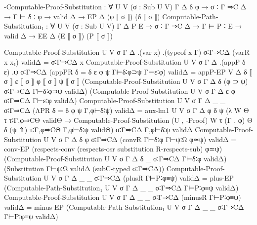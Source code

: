{-Computable-Proof-Substitution : ∀ U V (σ : Sub U V) Γ Δ δ φ →
  σ ∶ Γ ⇒C Δ → Γ ⊢ δ ∶ φ → valid Δ → EP Δ (φ ⟦ σ ⟧) (δ ⟦ σ ⟧)
Computable-Path-Substitution₁ : ∀ U V (σ : Sub U V) Γ Δ P E →
  σ ∶ Γ ⇒C Δ → Γ ⊢ P ∶ E → valid Δ → EE Δ (E ⟦ σ ⟧) (P ⟦ σ ⟧)

Computable-Proof-Substitution U V σ Γ Δ .(var x) .(typeof x Γ) σ∶Γ⇒CΔ (varR x x₁) validΔ = σ∶Γ⇒CΔ x
Computable-Proof-Substitution U V σ Γ Δ .(appP δ ε) .ψ σ∶Γ⇒CΔ (appPR {δ = δ} {ε} {φ} {ψ} Γ⊢δ∶φ⊃ψ Γ⊢ε∶φ) validΔ = appP-EP {V} {Δ} {δ ⟦ σ ⟧} {ε ⟦ σ ⟧} {φ ⟦ σ ⟧} {ψ ⟦ σ ⟧}
  (Computable-Proof-Substitution U V σ Γ Δ δ (φ ⊃ ψ) σ∶Γ⇒CΔ Γ⊢δ∶φ⊃ψ validΔ) 
  (Computable-Proof-Substitution U V σ Γ Δ ε φ σ∶Γ⇒CΔ Γ⊢ε∶φ validΔ)
Computable-Proof-Substitution U V σ Γ Δ _ _ σ∶Γ⇒CΔ (ΛPR {δ = δ} {φ} {ψ} Γ,φ⊢δ∶ψ) validΔ = 
  aux-lm1 U V σ Γ Δ φ δ ψ 
    (λ W Θ τ τ∶Γ,φ⇒CΘ validΘ → Computable-Proof-Substitution (U , -Proof) W τ (Γ , φ) Θ δ (ψ ⇑)
                          τ∶Γ,φ⇒CΘ Γ,φ⊢δ∶ψ validΘ) σ∶Γ⇒CΔ Γ,φ⊢δ∶ψ validΔ
Computable-Proof-Substitution U V σ Γ Δ δ φ σ∶Γ⇒CΔ (convR Γ⊢δ∶φ Γ⊢ψ∶Ω φ≃ψ) validΔ = 
  conv-EP (respects-conv (respects-osr substitution R-respects-sub) φ≃ψ) 
  (Computable-Proof-Substitution U V σ Γ Δ δ _ σ∶Γ⇒CΔ Γ⊢δ∶φ validΔ)
  (Substitution Γ⊢ψ∶Ω validΔ (subC-typed σ∶Γ⇒CΔ))
Computable-Proof-Substitution U V σ Γ Δ _ _ σ∶Γ⇒CΔ (plusR Γ⊢P∶φ≡ψ) validΔ = 
  plus-EP (Computable-Path-Substitution₁ U V σ Γ Δ _ _ σ∶Γ⇒CΔ Γ⊢P∶φ≡ψ validΔ)
Computable-Proof-Substitution U V σ Γ Δ _ _ σ∶Γ⇒CΔ (minusR Γ⊢P∶φ≡ψ) validΔ = 
  minus-EP (Computable-Path-Substitution₁ U V σ Γ Δ _ _ σ∶Γ⇒CΔ Γ⊢P∶φ≡ψ validΔ)

}
